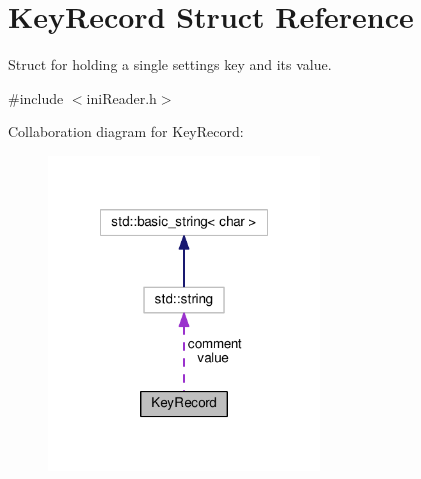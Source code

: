\hypertarget{structKeyRecord}{\section{\-Key\-Record \-Struct \-Reference}
\label{dc/dfa/structKeyRecord}
}


\-Struct for holding a single settings key and its value.  




{\ttfamily \#include $<$ini\-Reader.\-h$>$}



\-Collaboration diagram for \-Key\-Record\-:\nopagebreak
\begin{figure}[H]
\begin{center}
\leavevmode
\includegraphics[width=204pt]{da/d5d/structKeyRecord__coll__graph}
\end{center}
\end{figure}
